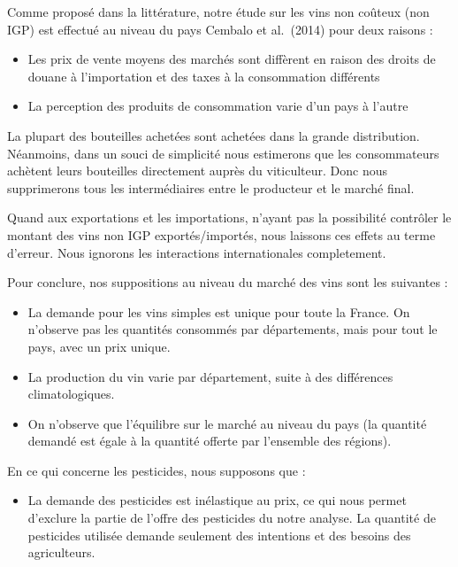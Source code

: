 \documentclass[11pt,]{article}
\begin{document}
Comme proposé dans la littérature, notre étude sur les vins non coûteux
(non IGP) est effectué au niveau du pays Cembalo et al.~(2014) pour deux
raisons :

\begin{itemize}
    \item Les prix de vente moyens des marchés sont diffèrent en raison des droits de douane à l'importation et des taxes à la consommation différents %
    \item La perception des produits de consommation varie d'un pays à l'autre %
\end{itemize}
\par

La plupart des bouteilles achetées sont achetées dans la grande
distribution. Néanmoins, dans un souci de simplicité nous estimerons que
les consommateurs achètent leurs bouteilles directement auprès du
viticulteur. Donc nous supprimerons tous les intermédiaires entre le
producteur et le marché final.

\par

Quand aux exportations et les importations, n'ayant pas la possibilité
contrôler le montant des vins non IGP exportés/importés, nous laissons
ces effets au terme d'erreur. Nous ignorons les interactions
internationales completement.

\par

Pour conclure, nos suppositions au niveau du marché des vins sont les
suivantes :

\begin{itemize}
    \item La demande pour les vins simples est unique pour toute la France. On n'observe pas les quantités consommés par départements, mais pour tout le pays, avec un prix unique. 
    \item La production du vin varie par département, suite à des différences climatologiques.
    \item On n'observe que l'équilibre sur le marché au niveau du pays (la quantité demandé est égale à la quantité offerte par l'ensemble des régions).
\end{itemize}
\par

En ce qui concerne les pesticides, nous supposons que :

\begin{itemize}
    \item La demande des pesticides est inélastique au prix, ce qui nous permet d'exclure la partie de l'offre des pesticides du notre analyse. La quantité de pesticides utilisée demande seulement des intentions et des besoins des agriculteurs. 
\end{itemize}
\end{document}
